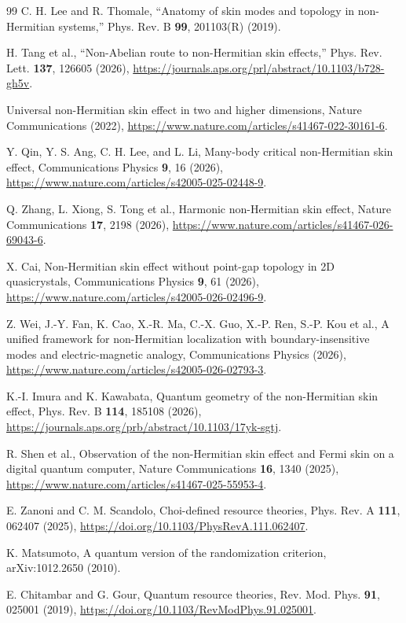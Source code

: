 \documentclass[11pt]{article}
\begin{document}
\begin{thebibliography}{99}
C. H. Lee and R. Thomale, ``Anatomy of skin modes and topology in non-Hermitian systems,'' Phys. Rev. B \textbf{99}, 201103(R) (2019).

H. Tang et al., ``Non-Abelian route to non-Hermitian skin effects,'' Phys. Rev. Lett. \textbf{137}, 126605 (2026),
\url{https://journals.aps.org/prl/abstract/10.1103/b728-gh5v}.


Universal non-Hermitian skin effect in two and higher dimensions, Nature Communications (2022),
\url{https://www.nature.com/articles/s41467-022-30161-6}.

Y. Qin, Y. S. Ang, C. H. Lee, and L. Li,
Many-body critical non-Hermitian skin effect,
Communications Physics \textbf{9}, 16 (2026),
\url{https://www.nature.com/articles/s42005-025-02448-9}.

Q. Zhang, L. Xiong, S. Tong et al.,
Harmonic non-Hermitian skin effect,
Nature Communications \textbf{17}, 2198 (2026),
\url{https://www.nature.com/articles/s41467-026-69043-6}.

X. Cai,
Non-Hermitian skin effect without point-gap topology in 2D quasicrystals,
Communications Physics \textbf{9}, 61 (2026),
\url{https://www.nature.com/articles/s42005-026-02496-9}.

Z. Wei, J.-Y. Fan, K. Cao, X.-R. Ma, C.-X. Guo, X.-P. Ren, S.-P. Kou et al.,
A unified framework for non-Hermitian localization with boundary-insensitive modes and electric-magnetic analogy,
Communications Physics (2026),
\url{https://www.nature.com/articles/s42005-026-02793-3}.

K.-I. Imura and K. Kawabata,
Quantum geometry of the non-Hermitian skin effect,
Phys. Rev. B \textbf{114}, 185108 (2026),
\url{https://journals.aps.org/prb/abstract/10.1103/17yk-sgtj}.

R. Shen et al.,
Observation of the non-Hermitian skin effect and Fermi skin on a digital quantum computer,
Nature Communications \textbf{16}, 1340 (2025),
\url{https://www.nature.com/articles/s41467-025-55953-4}.

E. Zanoni and C. M. Scandolo,
Choi-defined resource theories,
Phys. Rev. A \textbf{111}, 062407 (2025),
\url{https://doi.org/10.1103/PhysRevA.111.062407}.

K. Matsumoto,
A quantum version of the randomization criterion,
arXiv:1012.2650 (2010).

E. Chitambar and G. Gour,
Quantum resource theories,
Rev. Mod. Phys. \textbf{91}, 025001 (2019),
\url{https://doi.org/10.1103/RevModPhys.91.025001}.

\end{thebibliography}
\end{document}
